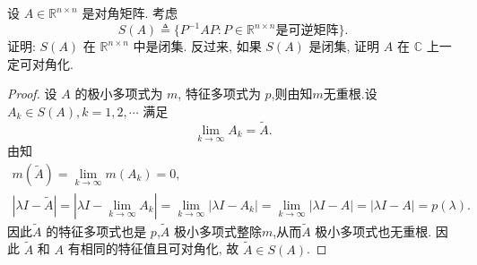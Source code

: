 \documentclass[../../main.tex]{subfiles}
\begin{document}
\begin{example}
设 \( A \in \mathbb{R}^{n \times n} \) 是对角矩阵. 考虑
\[
S(A) \triangleq \{ P^{-1}AP : P \in \mathbb{R}^{n \times n} \text{是可逆矩阵} \}.
\]
证明: \( S(A) \) 在 \( \mathbb{R}^{n \times n} \) 中是闭集. 反过来, 如果 \( S(A) \) 是闭集, 证明 \( A \) 在 \( \mathbb{C} \) 上一定可对角化.
\end{example}
\begin{proof}
设 \( A \) 的极小多项式为 \( m \), 特征多项式为 \( p \),则由知$m$无重根.设 \( A_k \in S(A), k = 1,2,\cdots \) 满足
\[
\lim_{k \to \infty} A_k = \tilde{A}.
\]
由知
\begin{gather*}
m(\tilde{A})=\lim_{k\rightarrow \infty} m(A_k)=0,
\\
\left| \lambda I-\tilde{A} \right|=\left| \lambda I-\lim_{k\rightarrow \infty} A_k \right|=\lim_{k\rightarrow \infty} \left| \lambda I-A_k \right|=\lim_{k\rightarrow \infty} \left| \lambda I-A \right|=\left| \lambda I-A \right|=p\left( \lambda \right) .
\end{gather*}
因此\( \tilde{A} \) 的特征多项式也是 \( p \),\( \tilde{A} \) 极小多项式整除$m$,从而\( \tilde{A} \) 极小多项式也无重根.  因此 \( \tilde{A} \) 和 \( A \) 有相同的特征值且可对角化, 故 \( \tilde{A} \in S(A) \).


\end{proof}
\end{document}
